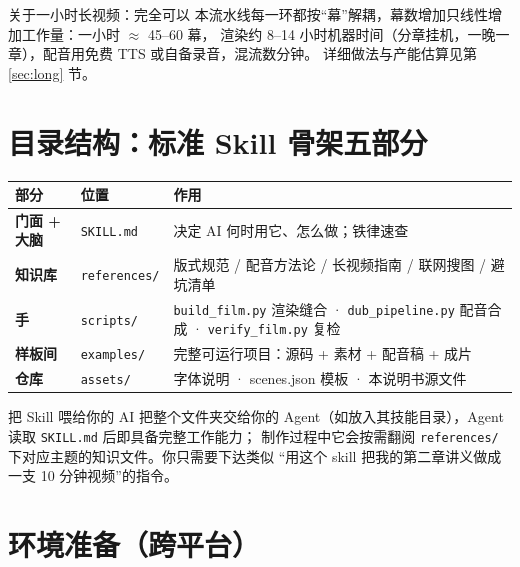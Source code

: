 \documentclass[12pt,a4paper]{ctexart}
\newcommand{\code}[1]{\texttt{\small #1}}
\begin{document}
\begin{okbox}{关于一小时长视频：完全可以}
本流水线每一环都按``幕''解耦，幕数增加只线性增加工作量：一小时 $\approx$ 45--60 幕，
渲染约 8--14 小时机器时间（分章挂机，一晚一章），配音用免费 TTS 或自备录音，混流数分钟。
详细做法与产能估算见第 \ref{sec:long} 节。
\end{okbox}

\section{目录结构：标准 Skill 骨架五部分}

\begin{center}
\begin{tabular}{>{\bfseries}p{2.6cm} p{4.6cm} p{7.2cm}}
\hline
\rowcolor{ptbg} 部分 & 位置 & 作用 \\
\hline
门面 + 大脑 & \code{SKILL.md} & 决定 AI 何时用它、怎么做；铁律速查 \\
知识库 & \code{references/} & 版式规范 / 配音方法论 / 长视频指南 / 联网搜图 / 避坑清单 \\
手 & \code{scripts/} & \code{build\_film.py} 渲染缝合 · \code{dub\_pipeline.py} 配音合成 · \code{verify\_film.py} 复检 \\
样板间 & \code{examples/} & 完整可运行项目：源码 + 素材 + 配音稿 + 成片 \\
仓库 & \code{assets/} & 字体说明 · scenes.json 模板 · 本说明书源文件 \\
\hline
\end{tabular}
\end{center}

\begin{infobox}{把 Skill 喂给你的 AI}
把整个文件夹交给你的 Agent（如放入其技能目录），Agent 读取 \code{SKILL.md} 后即具备完整工作能力；
制作过程中它会按需翻阅 \code{references/} 下对应主题的知识文件。你只需要下达类似
``用这个 skill 把我的第二章讲义做成一支 10 分钟视频''的指令。
\end{infobox}

\section{环境准备（跨平台）}
\end{document}
